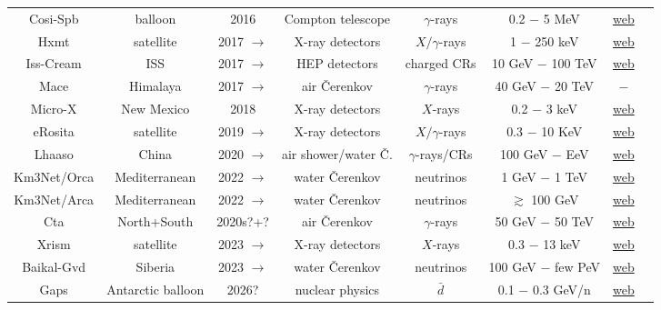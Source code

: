 \begin{table}[p]
\begin{center}
{\begin{tabular}{cccccccc}
{\sc  Cosi-Spb} & balloon & 2016 & Compton telescope & $\gamma$-rays & 0.2 $-$ 5 MeV& \href{http://cosi.ssl.berkeley.edu/}{web} & \cite{Cosi-Spb} \\
{\sc  Hxmt} & satellite & 2017 $\to$ & X-ray detectors & $X/\gamma$-rays & 1 $-$ 250 keV& \href{http://newshxmt.ihep.ac.cn/index.php/enhome}{web} & \cite{Hxmt} \\
{\sc  Iss-Cream} & ISS & 2017  $\to$ & HEP detectors & charged CRs & 10 GeV $-$ 100 TeV & \href{http://cosmicray.umd.edu/iss-cream/}{web} & \cite{Iss-Cream} \\
{\sc  Mace} & Himalaya & 2017  $\to$ & air \v Cerenkov & $\gamma$-rays & 40 GeV $-$ 20 TeV & \href{}{$-$} & \cite{Mace} \\
{\sc  Micro-X} & New Mexico &  2018 & X-ray detectors & $X$-rays & 0.2 $-$ 3 keV & \href{https://microx.northwestern.edu/}{web} & \cite{MicroX} \\
{\sc  eRosita} & satellite & 2019 $\to$ & X-ray detectors & $X/\gamma$-rays & 0.3 $-$ 10 KeV& \href{http://www.mpe.mpg.de/eROSITA}{web} & \cite{eRosita} \\
{\sc  Lhaaso} & China &  2020 $\to$ & air shower/water \v C. & $\gamma$-rays/CRs & 100 GeV $-$ EeV & \href{http://english.ihep.cas.cn/lhaaso/}{web} & \cite{Lhaaso} \\
{\sc  Km3Net/Orca} & Mediterranean & 2022 $\to$ & water \v Cerenkov & neutrinos & 1 GeV $-$ 1 TeV & \href{http://www.km3net.org}{web} & \cite{Km3NeT} \\
{\sc  Km3Net/Arca} & Mediterranean & 2022 $\to$ & water \v Cerenkov & neutrinos & $\gtrsim$ 100 GeV & \href{http://www.km3net.org}{web} & \cite{Km3NeT} \\
{\sc  Cta} & North+South &  2020s?+? & air \v Cerenkov & $\gamma$-rays & 50 GeV $-$ 50 TeV & \href{http://www.cta-observatory.org}{web} & \cite{Cta} \\
{\sc  Xrism} & satellite & 2023 $\to$ & X-ray detectors & $X$-rays & 0.3 $-$ 13 keV & \href{https://www.cosmos.esa.int/web/xrism}{web} & \cite{Xrism} \\
 {\sc  Baikal-Gvd} & Siberia & 2023 $\to$ & water \v Cerenkov & neutrinos & 100 GeV $-$ few PeV & \href{https://baikalgvd.jinr.ru/}{web} & \cite{BaikalGvd} \\
{\sc  Gaps} & Antarctic balloon & 2026? & nuclear physics & $\bar d$ & 0.1 $-$ 0.3 GeV/n & \href{https://gaps1.astro.ucla.edu/gaps/index.html}{web} & \cite{Gaps} \\

\end{tabular}}
\end{center}
\end{table}
